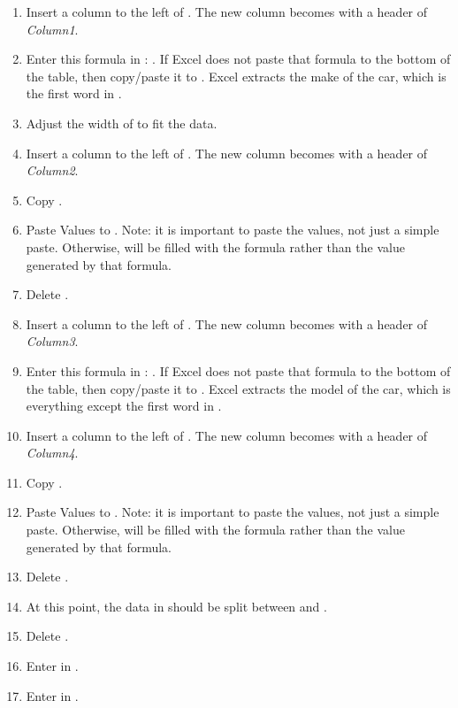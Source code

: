 \begin{enumerate}[resume]
	\begin{enumerate}
		\item Insert a column to the left of . The new column becomes  with a header of \textit{Column1}.
		\item Enter this formula in : . If Excel does not paste that formula to the bottom of the table, then copy/paste it to . Excel extracts the make of the car, which is the first word in .
		\item Adjust the width of  to fit the data.
		\item Insert a column to the left of . The new column becomes  with a header of \textit{Column2}.
		\item Copy .
		\item Paste Values to . Note: it is important to paste the values, not just a simple paste. Otherwise,  will be filled with the formula rather than the value generated by that formula.
		\item Delete .

		\item Insert a column to the left of . The new column becomes  with a header of \textit{Column3}.
		\item Enter this formula in : . If Excel does not paste that formula to the bottom of the table, then copy/paste it to . Excel extracts the model of the car, which is everything except the first word in .
		\item Insert a column to the left of . The new column becomes  with a header of \textit{Column4}.
		\item Copy .
		\item Paste Values to . Note: it is important to paste the values, not just a simple paste. Otherwise,  will be filled with the formula rather than the value generated by that formula.
		\item Delete .
		\item At this point, the data in  should be split between  and .
		\item Delete .
		\item Enter  in .
		\item Enter  in .


\end{enumerate}
\end{enumerate}
